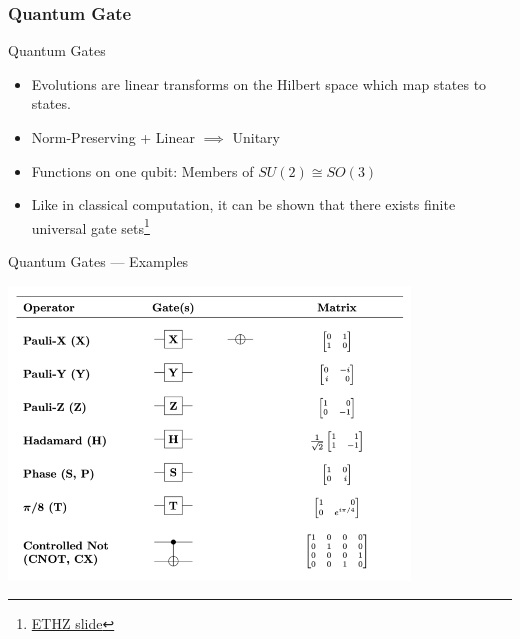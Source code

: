 \documentclass{beamer}
\newcommand{\<}{\langle}
\renewcommand{\>}{\rangle}
\begin{document}

\subsubsection{Quantum Gate}

\begin{frame}{Quantum Gates}
    \begin{itemize}
        \item Evolutions are linear transforms on the Hilbert space which map states to states.
        \item Norm-Preserving + Linear $\implies$ Unitary 
        \item Functions on one qubit: Members of $SU(2) \cong SO(3)$
        \item Like in classical computation, it can be shown that there exists finite universal gate sets\footnote[frame]{\href{https://qudev.phys.ethz.ch/static/content/courses/QSIT07/presentations/Schmassmann.pdf}{ETHZ slide}}
    \end{itemize}
\end{frame}


\begin{frame}{Quantum Gates --- Examples}

\begin{center}
    \includegraphics[width=0.8\textwidth]{quantum_gates.png}
\end{center}

\end{frame}
\end{document}
